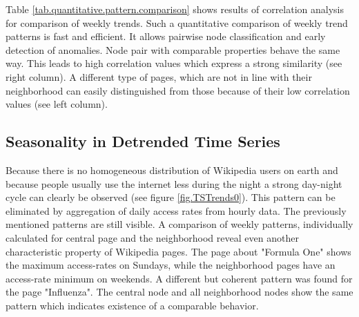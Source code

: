 \documentclass[a4paper,10pt]{scrbook}
\begin{document}
Table \ref{tab.quantitative.pattern.comparison} shows results of correlation analysis for  comparison of weekly trends. Such a quantitative comparison of weekly trend patterns is fast and efficient. It allows pairwise node classification and early detection of anomalies. Node pair with comparable properties behave the same way. This leads to high correlation values which express a strong similarity (see right column). A different type of pages, which are not in line with their neighborhood can easily distinguished from those because of their low correlation values (see left column).

\subsection{Seasonality in Detrended Time Series}
Because there is no homogeneous distribution of Wikipedia users on earth and because people usually use the internet less during the night a strong day-night cycle can clearly be observed (see figure \ref{fig.TSTrends0}). This pattern can be eliminated by aggregation of daily access rates from hourly data. The previously mentioned patterns are still visible. A comparison of weekly patterns, individually calculated for central page and the neighborhood reveal even another characteristic property of Wikipedia pages. The page about "Formula One" shows the maximum access-rates on Sundays, while the neighborhood pages have an access-rate minimum on weekends. A different but coherent pattern was found for the page "Influenza". The central node and all neighborhood nodes show the same pattern which indicates existence of a comparable behavior.

\label{ext.fig.DataSetDescription1.e} 

\end{document}
